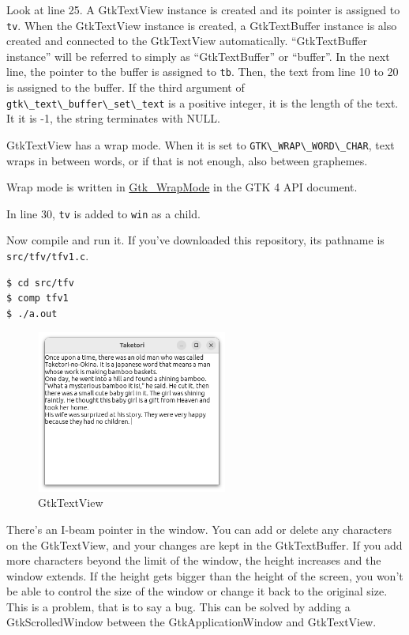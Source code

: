 Look at line 25. A GtkTextView instance is created and its pointer is
assigned to \passthrough{\lstinline!tv!}. When the GtkTextView instance
is created, a GtkTextBuffer instance is also created and connected to
the GtkTextView automatically. ``GtkTextBuffer instance'' will be
referred to simply as ``GtkTextBuffer'' or ``buffer''. In the next line,
the pointer to the buffer is assigned to \passthrough{\lstinline!tb!}.
Then, the text from line 10 to 20 is assigned to the buffer. If the
third argument of \passthrough{\lstinline!gtk\_text\_buffer\_set\_text!}
is a positive integer, it is the length of the text. It it is -1, the
string terminates with NULL.

GtkTextView has a wrap mode. When it is set to
\passthrough{\lstinline!GTK\_WRAP\_WORD\_CHAR!}, text wraps in between
words, or if that is not enough, also between graphemes.

Wrap mode is written in
\href{https://docs.gtk.org/gtk4/enum.WrapMode.html}{Gtk\_WrapMode} in
the GTK 4 API document.

In line 30, \passthrough{\lstinline!tv!} is added to
\passthrough{\lstinline!win!} as a child.

Now compile and run it. If you've downloaded this repository, its
pathname is \passthrough{\lstinline!src/tfv/tfv1.c!}.

\begin{lstlisting}
$ cd src/tfv
$ comp tfv1
$ ./a.out
\end{lstlisting}

\begin{figure}
\centering
\includegraphics[width=6.3cm,height=5.325cm]{../image/screenshot_tfv1.png}
\caption{GtkTextView}
\end{figure}

There's an I-beam pointer in the window. You can add or delete any
characters on the GtkTextView, and your changes are kept in the
GtkTextBuffer. If you add more characters beyond the limit of the
window, the height increases and the window extends. If the height gets
bigger than the height of the screen, you won't be able to control the
size of the window or change it back to the original size. This is a
problem, that is to say a bug. This can be solved by adding a
GtkScrolledWindow between the GtkApplicationWindow and GtkTextView.

